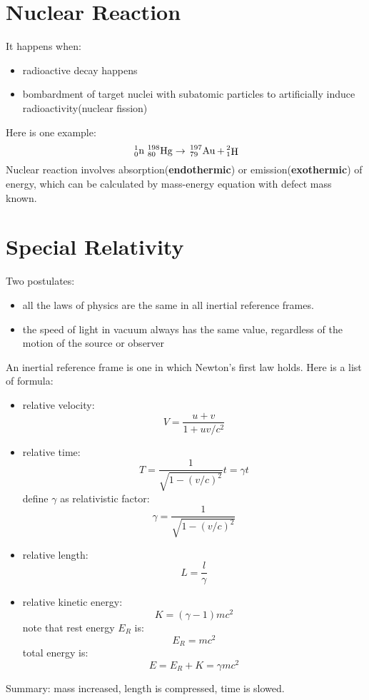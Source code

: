 \documentclass[10pt,a4paper,oneside]{article}
\begin{document}
\section{Nuclear Reaction}
It happens when:
\begin{itemize}
	\item radioactive decay happens
	\item bombardment of target nuclei with subatomic particles to artificially induce radioactivity(nuclear fission)
\end{itemize}
Here is one example:
\[
\sideset{^{1}_{0}}{}{\mathop{\mathrm{n}}}
\sideset{^{198}_{80}}{}{\mathop{\mathrm{Hg}}} \rightarrow \sideset{^{197}_{79}}{}{\mathop{\mathrm{Au}}}+\sideset{^{2}_{1}}{}{\mathop{\mathrm{H}}}
\]
Nuclear reaction involves absorption(\textbf{endothermic}) or emission(\textbf{exothermic}) of energy, which can be calculated by mass-energy equation with defect mass known.

\section{Special Relativity}
Two postulates:
\begin{itemize}
	\item all the laws of physics are the same in all inertial reference frames.
	\item the speed of light in vacuum always has the same value, regardless of the motion of the source or observer
\end{itemize}
An inertial reference frame is one in which Newton’s first law holds. Here is a list of formula:
\begin{itemize}
	\item relative velocity:
	\[
	V = \frac{u+v}{1+uv/c^2}
	\]
	\item relative time:
	\[
	T = \frac{1}{\sqrt{1 - (v/c)^2}} t = \gamma t
	\]
	define $\gamma$ as relativistic factor:
	\[
	\gamma = \frac{1}{\sqrt{1 - (v/c)^2}}
	\]
	\item relative length:
	\[
	L =\frac{l}{\gamma}
	\]
	\item relative kinetic energy:
	\[
	K = (\gamma-1) mc^2
	\]
	note that rest energy $E_R$ is:
	\[
	E_R = mc^2
	\]
	total energy is:
	\[
	E = E_R + K = \gamma m c^2
	\]
\end{itemize}
Summary: mass increased, length is compressed, time is slowed.
\end{document}
